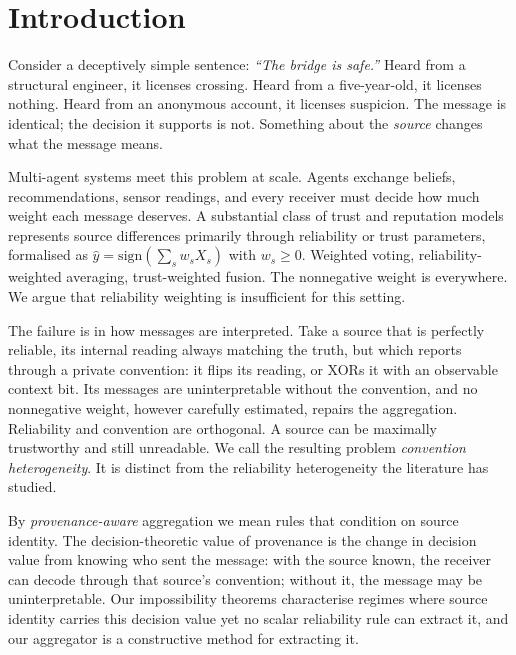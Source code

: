 \section{Introduction}

Consider a deceptively simple sentence: \emph{``The bridge is safe.''}
Heard from a structural engineer, it licenses crossing. Heard from a
five-year-old, it licenses nothing. Heard from an anonymous account, it
licenses suspicion. The message is identical; the decision it supports is
not. Something about the \emph{source} changes what the message means.

Multi-agent systems meet this problem at scale. Agents exchange beliefs,
recommendations, sensor readings, and every receiver must decide how much
weight each message deserves. A substantial class of trust and reputation
models represents source differences primarily through reliability or
trust parameters, formalised as $\hat{y} = \mathrm{sign}(\sum_s w_s X_s)$
with $w_s \geq 0$. Weighted voting, reliability-weighted averaging,
trust-weighted fusion. The nonnegative weight is everywhere. We argue that
reliability weighting is insufficient for this setting.

The failure is in how messages are interpreted. Take a source that is
perfectly reliable, its internal reading always matching the truth, but
which reports through a private convention: it flips its reading, or XORs
it with an observable context bit. Its messages are uninterpretable without
the convention, and no nonnegative weight, however carefully estimated,
repairs the aggregation. Reliability and convention are orthogonal. A
source can be maximally trustworthy and still unreadable. We call the
resulting problem \emph{convention heterogeneity}. It is distinct from the
reliability heterogeneity the literature has studied.

By \emph{provenance-aware} aggregation we mean rules that condition on
source identity. The decision-theoretic value of provenance is the change
in decision value from knowing who sent the message: with the source
known, the receiver can decode through that source's convention; without
it, the message may be uninterpretable. Our impossibility theorems characterise regimes where source
identity carries this decision value yet no scalar reliability rule can
extract it, and our aggregator is a constructive method for extracting it.

